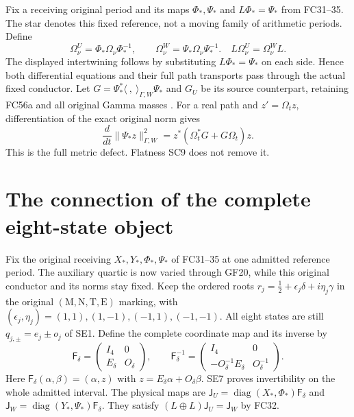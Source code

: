 \documentclass[11pt]{article}
\begin{document}
Fix a receiving original period and its maps $\Phi_*,\Psi_*$ and
$L\Phi_*=\Psi_*$ from FC31--35. The star denotes this fixed reference,
not a moving family of arithmetic periods. Define
\[
 \Omega^U_\nu=\Phi_*\Omega_\nu\Phi_*^{-1},\qquad
 \Omega^W_\nu=\Psi_*\Omega_\nu\Psi_*^{-1}.
 \quad L\Omega^U_\nu=\Omega^W_\nu L. \tag{SC11}
\]
The displayed intertwining follows by substituting $L\Phi_*=\Psi_*$
on each side. Hence both differential equations and their full path
transports pass through the actual fixed conductor. Let
$G=\Psi_*^*\langle\ ,\ \rangle_{\Gamma,W}\Psi_*$ and $G_U$ be its
source counterpart, retaining FC56a and all original Gamma masses
\cite{WCF}. For a real path and $z'=\Omega_tz$, differentiation of
the exact original norm gives
\[
 \frac{d}{dt}\|\Psi_*z\|_{\Gamma,W}^2
       =z^*(\Omega_t^*G+G\Omega_t)z. \tag{SC12}
\]
This is the full metric defect. Flatness SC9 does not remove it.

\section{The connection of the complete eight-state object}
Fix the original receiving $X_*,Y_*,\Phi_*,\Psi_*$ of FC31--35 at
one admitted reference period. The auxiliary quartic is now varied
through GF20, while this original conductor and its norms stay fixed.
Keep the ordered roots
$r_j=\tfrac12+\epsilon_j\delta+i\eta_j\gamma$ in the original
$(\mathrm M,\mathrm N,\mathrm T,\mathrm E)$ marking, with
$(\epsilon_j,\eta_j)=(1,1),(1,-1),(-1,1),(-1,-1)$.
All eight states are still $q_{j,\pm}=e_j\pm o_j$ of SE1.
Define the complete coordinate map and its inverse by
\[
 \mathsf F_\delta=
 \begin{pmatrix}I_4&0\\ E_\delta&O_\delta\end{pmatrix},\qquad
 \mathsf F_\delta^{-1}=
 \begin{pmatrix}I_4&0\\-O_\delta^{-1}E_\delta&O_\delta^{-1}\end{pmatrix}.
 \tag{TC1}
\]
Here $\mathsf F_\delta(\alpha,\beta)=(\alpha,z)$ with
$z=E_\delta\alpha+O_\delta\beta$. SE7 proves invertibility on the
whole admitted interval. The physical maps are
$\mathsf J_U=\operatorname{diag}(X_*,\Phi_*)\mathsf F_\delta$ and
$\mathsf J_W=\operatorname{diag}(Y_*,\Psi_*)\mathsf F_\delta$.
They satisfy $(L\oplus L)\mathsf J_U=\mathsf J_W$ by FC32.
\end{document}
